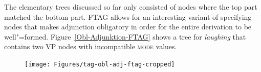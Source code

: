 The elementary trees discussed so far only consisted of nodes where the top part matched the bottom part. FTAG allows for an interesting variant of specifying 
nodes that makes adjunction obligatory\label{page-feature-based-tag-oa} in order for the entire derivation to be well"=formed.
Figure~\vref{Obl-Adjunktion-FTAG} shows a tree for \emph{laughing} that contains two VP nodes with incompatible \textsc{mode} values.
\begin{figure}
\centerline{%
\texttt{[image: Figures/tag-obl-adj-ftag-cropped]}
}

\end{figure}
